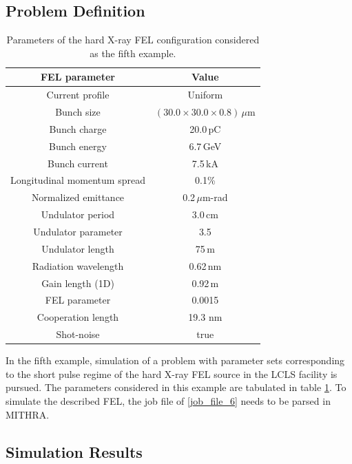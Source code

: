 \subsection{Problem Definition}

\begin{table}
	\label{example5}
	\caption{Parameters of the hard X-ray FEL configuration considered as the fifth example.}
	\centering
	{\footnotesize
	\begin{tabular}{|c||c|}
		\hline
		FEL parameter & Value \\ \hline \hline
		Current profile & Uniform \\ \hline
		Bunch size & $(30.0\times30.0\times0.8)\,\mu$m \\ \hline
		Bunch charge & 20.0\,pC \\ \hline
		Bunch energy & 6.7\,GeV \\	\hline
		Bunch current & 7.5\,kA \\ \hline
		Longitudinal momentum spread & 0.1\% \\ \hline
		Normalized emittance & 0.2\,$\mu$m-rad \\	\hline
		Undulator period & 3.0\,cm \\ \hline
		Undulator parameter & 3.5 \\ \hline
		Undulator length & 75\,m \\ \hline
		Radiation wavelength & 0.62\,nm \\ \hline
		Gain length (1D) & 0.92\,m \\ \hline
		FEL parameter & 0.0015 \\ \hline
		Cooperation length & 19.3 nm \\ \hline
		Shot-noise & true \\ \hline
	\end{tabular}
	}	
\end{table}
%
In the fifth example, simulation of a problem with parameter sets corresponding to the short pulse regime of the hard X-ray FEL source in the LCLS facility is pursued.
%
The parameters considered in this example are tabulated in table \ref{example5}.
%
To simulate the described FEL, the job file of \ref{job_file_6} needs to be parsed in MITHRA.

\subsection{Simulation Results}

